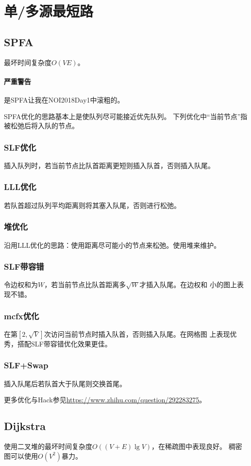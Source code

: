 \section{单/多源最短路}
\subsection{SPFA}
最坏时间复杂度$O(VE)$。
\paragraph{严重警告}
是SPFA让我在NOI2018Day1中滚粗的。

SPFA优化的思路基本上是使队列尽可能接近优先队列。
下列优化中``当前节点''指被松弛后将入队的节点。
\subsubsection{SLF优化}
插入队列时，若当前节点比队首距离更短则插入队首，否则插入队尾。
\subsubsection{LLL优化}
若队首超过队列平均距离则将其塞入队尾，否则进行松弛。
\subsubsection{堆优化}
沿用LLL优化的思路：使用距离尽可能小的节点来松弛。使用堆来维护。
\subsubsection{SLF带容错}
令边权和为$W$，若当前节点比队首距离多$\sqrt{W}$才插入队尾。在边权和
小的图上表现不错。
\subsubsection{mcfx优化}
在第$[2,\sqrt{V}]$次访问当前节点时插入队首，否则插入队尾。在网格图
上表现优秀，搭配SLF带容错优化效果更佳。
\subsubsection{SLF+Swap}
插入队尾后若队首大于队尾则交换首尾。

更多优化与Hack参见\url{https://www.zhihu.com/question/292283275}。
\subsection{Dijkstra}
使用二叉堆的最坏时间复杂度$O((V+E)\lg V)$，在稀疏图中表现良好。
稠密图可以使用$O(V^2)$暴力。

